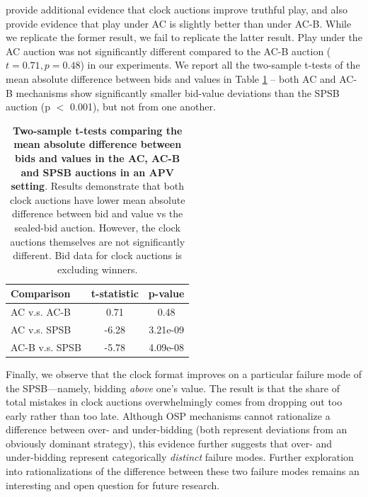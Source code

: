 \documentclass{article} %
\begin{document}
\vspace{-.5cm}

\citet{breitmoser2022obviousness} provide additional evidence that clock auctions improve truthful play, and also provide evidence that play under AC is slightly better than under AC-B. While we replicate the former result, we fail to replicate the latter result. Play under the AC auction was not significantly different compared to the AC-B auction ($t = 0.71, p =0.48$) in our experiments. We report all the two-sample t-tests of the mean absolute difference between bids and values in Table \ref{tab:t-test-results} -- both AC and AC-B mechanisms show significantly smaller bid-value deviations than the SPSB auction (p $<$ 0.001), but not from one another. 

\begin{table}[h]
\centering
\begin{tabular}{l|c|c}
\hline
\textbf{Comparison} & \textbf{t-statistic} & \textbf{p-value} \\
\hline
AC v.s. AC-B & 0.71 & 0.48 \\
\hline
AC v.s. SPSB & -6.28 & 3.21e-09 \\
\hline
AC-B v.s. SPSB& -5.78 & 4.09e-08 \\
\hline
\end{tabular}
\caption{\textbf{Two-sample t-tests comparing the mean absolute difference between bids and values in the AC, AC-B and SPSB auctions in an APV setting}. Results demonstrate that both clock auctions have lower mean absolute difference between bid and value vs the sealed-bid auction. However, the clock auctions themselves are not significantly different. Bid data for clock auctions is excluding winners.
\label{tab:t-test-results}}
\end{table}

Finally, we observe that the clock format improves on a particular failure mode of the SPSB—namely, bidding \textit{above} one's value. The result is that the share of total mistakes in clock auctions overwhelmingly comes from dropping out too early rather than too late. Although OSP mechanisms cannot rationalize a difference between over- and under-bidding (both represent deviations from an obviously dominant strategy), this evidence further suggests that over- and under-bidding represent categorically \textit{distinct} failure modes. Further exploration into rationalizations of the difference between these two failure modes remains an interesting and open question for future research.
\end{document}

